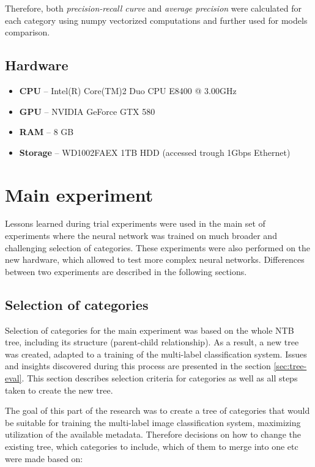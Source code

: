     Therefore, both \textit{precision-recall curve} and \textit{average precision} were calculated for each category using numpy vectorized computations and further used for models comparison.
    
    \subsection{Hardware}
    \label{sec:trial-hw}
    \begin{itemize}
        \item \textbf{CPU} -- Intel(R) Core(TM)2 Duo CPU E8400 @ 3.00GHz
        \item \textbf{GPU} -- NVIDIA GeForce GTX 580
        \item \textbf{RAM} -- 8 GB
        \item \textbf{Storage} -- WD1002FAEX 1TB HDD (accessed trough 1Gbps Ethernet)
    \end{itemize}


\section{Main experiment}
    Lessons learned during trial experiments were used in the main set of experiments where the neural network was trained on much broader and challenging selection of categories. These experiments were also performed on the new hardware, which allowed to test more complex neural networks. Differences between two experiments are described in the following sections.
    
    \subsection{Selection of categories}
    \label{sec:main-cat-selection}
    Selection of categories for the main experiment was based on the whole NTB tree, including its structure (parent-child relationship). As a result, a new tree was created, adapted to a training of the multi-label classification system. Issues and insights discovered during this process are presented in the section \ref{sec:tree-eval}. This section describes selection criteria for categories as well as all steps taken to create the new tree.
    
    The goal of this part of the research was to create a tree of categories that would be suitable for training the multi-label image classification system, maximizing utilization of the available metadata. Therefore decisions on how to change the existing tree, which categories to include, which of them to merge into one etc were made based on:
    
